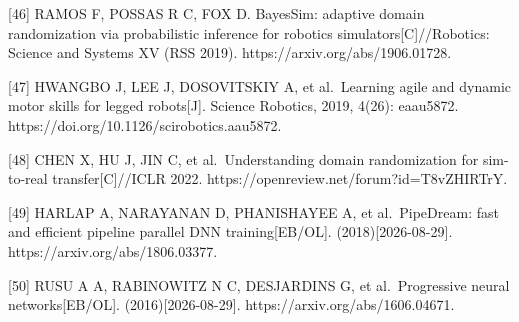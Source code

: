 \documentclass[
  chinese,
]{ctexart}
\begin{document}
{[}46{]} RAMOS F, POSSAS R C, FOX D. BayesSim: adaptive domain
randomization via probabilistic inference for robotics
simulators{[}C{]}//Robotics: Science and Systems XV (RSS 2019).
https://arxiv.org/abs/1906.01728.

{[}47{]} HWANGBO J, LEE J, DOSOVITSKIY A, et al.~Learning agile and
dynamic motor skills for legged robots{[}J{]}. Science Robotics, 2019,
4(26): eaau5872. https://doi.org/10.1126/scirobotics.aau5872.

{[}48{]} CHEN X, HU J, JIN C, et al.~Understanding domain randomization
for sim-to-real transfer{[}C{]}//ICLR 2022.
https://openreview.net/forum?id=T8vZHIRTrY.

{[}49{]} HARLAP A, NARAYANAN D, PHANISHAYEE A, et al.~PipeDream: fast
and efficient pipeline parallel DNN training{[}EB/OL{]}.
(2018){[}2026-08-29{]}. https://arxiv.org/abs/1806.03377.

{[}50{]} RUSU A A, RABINOWITZ N C, DESJARDINS G, et al.~Progressive
neural networks{[}EB/OL{]}. (2016){[}2026-08-29{]}.
https://arxiv.org/abs/1606.04671.
\end{document}
